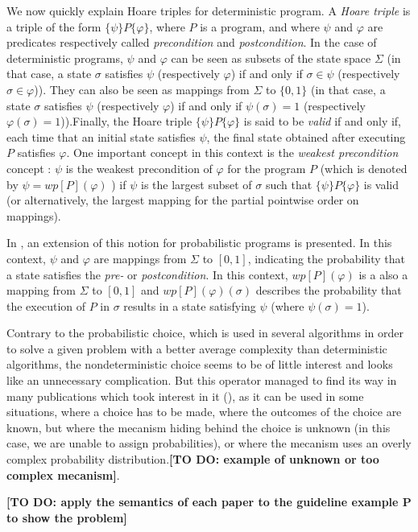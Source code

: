 \documentclass[a4paper,10pt]{llncs}
\newcommand\todo[1]{{\color{red}\textbf{[TO DO:  #1]}}}
\begin{document}
{We now quickly explain Hoare triples for deterministic program. A \emph{Hoare triple} is a triple of the form $\{\psi\}P\{\varphi\}$, where $P$ is a program, and where $\psi$ and $\varphi$ are predicates respectively called \emph{precondition} and \emph{postcondition}. In the case of deterministic programs, $\psi$ and $\varphi$ can be seen as subsets of the state space $\Sigma$ (in that case, a state $\sigma$ satisfies $\psi$ (respectively $\varphi$) if and only if $\sigma \in \psi$ (respectively $\sigma \in \varphi$)). They can also be seen as mappings from $\Sigma$ to $\{0,1\}$ (in that case, a state $\sigma$ satisfies $\psi$ (respectively $\varphi$) if and only if $\psi(\sigma) = 1$ (respectively $\varphi(\sigma) = 1$)).\newline Finally, the Hoare triple $\{\psi\}P\{\varphi\}$ is said to be \emph{valid} if and only if, each time that an initial state satisfies $\psi$, the final state obtained after executing $P$ satisfies $\varphi$.  One important concept in this context is the \emph{weakest precondition} concept \cite{Dijkstra76}: $\psi$ is the weakest precondition of $\varphi$ for the program $P$ (which is denoted by $\psi = wp[P](\varphi)$ ) if $\psi$ is the largest subset of $\sigma$ such that $\{\psi\}P\{\varphi\}$ is valid (or alternatively, the largest mapping for the partial pointwise order on mappings).\bigskip

In \cite{McIver05}, an extension of this notion for probabilistic programs is presented. In this context, $\psi$ and $\varphi$ are mappings from $\Sigma$ to $[0,1]$, indicating the probability that a state satisfies the \emph{pre-} or \emph{postcondition}. In this context, $wp[P](\varphi)$ is a also a mapping from $\Sigma$ to $[0,1]$ and $wp[P](\varphi)(\sigma)$ describes the probability that the execution of $P$ in $\sigma$ results in a state satisfying $\psi$ (where $\psi(\sigma) = 1$).

Contrary to the probabilistic choice, which is used in several algorithms in order to solve a given problem with a better average complexity than deterministic algorithms, the nondeterministic choice seems to be of little interest and looks like an unnecessary complication. But this operator managed to find its way in many publications which took interest in it (\cite{WuChen08,WuChen11,WuChen12,McIver05}), as it can be used in some situations, where a choice has to be made, where the outcomes of the choice are known, but where the mecanism hiding behind the choice is unknown (in this case, we are unable to assign probabilities), or where the mecanism uses an overly complex probability distribution.\todo{example of unknown or too complex mecanism}.\newline

 \todo{apply the semantics of each paper to the guideline example P to show the problem}
}
\end{document}
